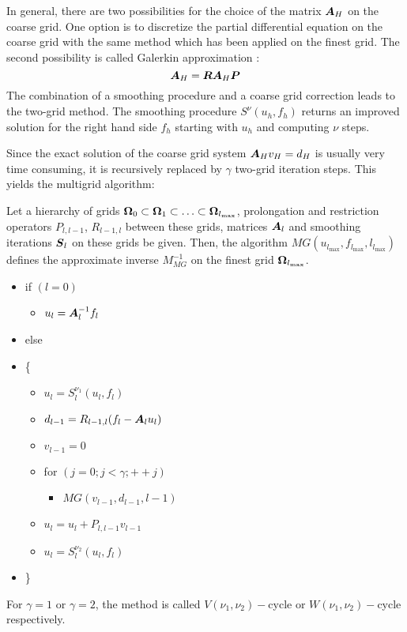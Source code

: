 In general, there are two possibilities for the choice of the matrix
$\boldsymbol{A}_H$ on the coarse grid. One option is to discretize the partial
differential equation on the coarse grid with the same method which has been
applied on the finest grid. The second possibility is called Galerkin 
approximation \cite{amg_course}:
\begin{equation}
\boldsymbol{A}_H = \boldsymbol{R}\boldsymbol{A}_H \boldsymbol{P}
\end{equation}
The combination of a smoothing procedure and a coarse grid correction leads to 
the two-grid method. The smoothing procedure $S^{\nu}(u_h,f_h)$ returns an 
improved solution for the right hand side $f_h$ starting with $u_h$ and 
computing $\nu$ steps.

Since the exact solution of the coarse grid system $\boldsymbol{A}_H v_H = d_H$ is 
usually very time consuming, it is recursively replaced by $\gamma$ two-grid 
iteration steps. This yields the multigrid algorithm:
\begin{algorithm}
Let a hierarchy of grids $\boldsymbol{\Omega}_0 \subset \boldsymbol{\Omega}_1 \subset \hdots \subset
\boldsymbol{\Omega}_{l_{\max}}$, prolongation and restriction operators $P_{l,l-1}$,
$R_{l-1,l}$ between these grids, matrices $\boldsymbol{A}_l$ and smoothing iterations
$\boldsymbol{S}_l$ on these grids be given. Then, the algorithm
$MG(u_{l_{\max}},f_{l_{\max}},l_{l_{\max}})$ defines the approximate inverse
$M_{MG}^{-1}$ on the finest grid $\boldsymbol{\Omega}_{l_{\max}}$.
\begin{itemize}
\item[] if $(l=0)$
\begin{itemize}
\item[] $u_l = \boldsymbol{A}_l^{-1} f_l$
\end{itemize}
\item[] else
\item[] \{
\begin{itemize}
\item[] $u_l=S_l^{\nu_1}(u_l,f_l)$
\item[] $d_{l-1} = R_{l-1,l}(f_l-\boldsymbol{A}_l u_l)$
\item[] $v_{l-1} = 0$
\item[] for $(j=0; j<\gamma;++j)$
\begin{itemize}
\item[] $MG (v_{l-1},d_{l-1},l-1)$
\end{itemize}
\item[] $u_l=u_l+P_{l,l-1} v_{l-1}$
\item[] $u_l=S_l^{\nu_2}(u_l,f_l)$
\end{itemize}
\item[] \}
\end{itemize}
\label{2_1_1}
\end{algorithm}
For $\gamma = 1$ or $\gamma = 2$, the method is called $V(\nu_1,\nu_2)-$cycle
or $W(\nu_1,\nu_2)-$cycle respectively. 

